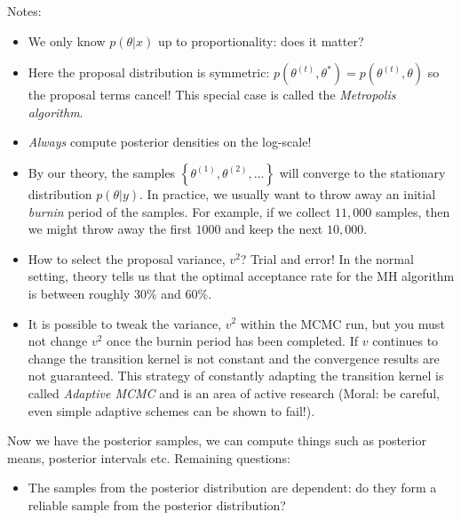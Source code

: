 \documentclass[11pt]{article}
\begin{document}
\begin{itemize}
\begin{itemize}
    Notes:
    \begin{itemize}
    \item We only know $p(\theta|x)$ up to proportionality: does it matter?
    \item Here the proposal distribution is symmetric: $p(\theta^{(t)},\theta^{*})=p(\theta^{(t)},\theta)$ so the proposal terms cancel! This special case is called the \emph{Metropolis algorithm}. 
    \item \emph{Always} compute posterior densities on the log-scale!
    \item  By our theory, the samples $\left\{\theta^{(1)},\theta^{(2)},\ldots\right\}$ will converge to the stationary distribution $p(\theta|y)$. In practice, we usually want to throw away an initial \emph{burnin} period of the samples. For example, if we collect $11,000$ samples, then we might throw away the first $1000$ and keep the next $10,000$. 
    \item How to select the proposal variance, $v^{2}$? Trial and error! In the normal setting, theory tells us that the optimal acceptance rate for the MH algorithm is between roughly $30\%$ and $60\%$. 
    \item It is possible to tweak the variance, $v^{2}$ within the MCMC run, but you must not change $v^{2}$ once the burnin period has been completed. If $v$ continues to change the transition kernel is not constant and the convergence results are not guaranteed. This strategy of constantly adapting the transition kernel is called \emph{Adaptive MCMC} and is an area of active research (Moral: be careful, even simple adaptive schemes can be shown to fail!). 
    \end{itemize}
    
    Now we have the posterior samples, we can compute things such as posterior means, posterior intervals etc.  Remaining questions:
    \begin{itemize}
    \item The samples from the posterior distribution are dependent: do they form a reliable sample from the posterior distribution?
    \end{itemize}
  \end{itemize}
    

\end{itemize}
\end{document}
